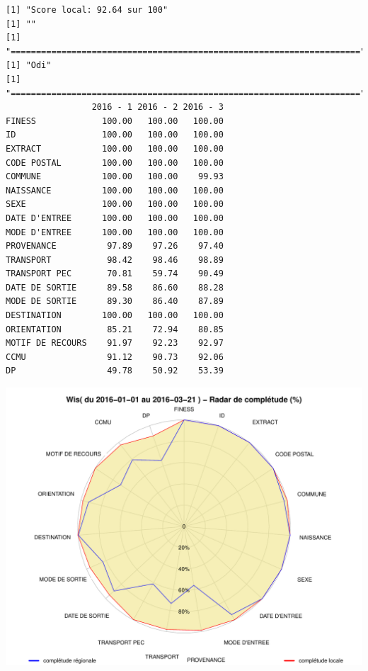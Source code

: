 \documentclass[]{article}
\begin{document}
\begin{verbatim}
[1] "Score local: 92.64 sur 100"
[1] ""
[1] "====================================================================="
[1] "Odi"
[1] "====================================================================="
                 2016 - 1 2016 - 2 2016 - 3
FINESS             100.00   100.00   100.00
ID                 100.00   100.00   100.00
EXTRACT            100.00   100.00   100.00
CODE POSTAL        100.00   100.00   100.00
COMMUNE            100.00   100.00    99.93
NAISSANCE          100.00   100.00   100.00
SEXE               100.00   100.00   100.00
DATE D'ENTREE      100.00   100.00   100.00
MODE D'ENTREE      100.00   100.00   100.00
PROVENANCE          97.89    97.26    97.40
TRANSPORT           98.42    98.46    98.89
TRANSPORT PEC       70.81    59.74    90.49
DATE DE SORTIE      89.58    86.60    88.28
MODE DE SORTIE      89.30    86.40    87.89
DESTINATION        100.00   100.00   100.00
ORIENTATION         85.21    72.94    80.85
MOTIF DE RECOURS    91.97    92.23    92.97
CCMU                91.12    90.73    92.06
DP                  49.78    50.92    53.39
\end{verbatim}

\includegraphics{completude_files/figure-latex/finess-8.pdf}
\end{document}
